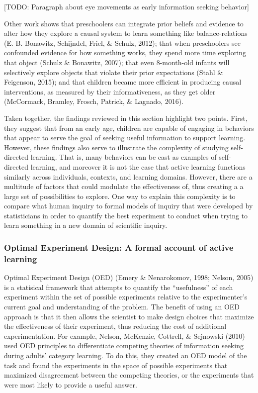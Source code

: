 \documentclass[a4paper,man,apacite,floatsintext]{apa6}
\begin{document}
{[}TODO: Paragraph about eye movements as early information seeking
behavior{]}

Other work shows that preschoolers can integrate prior beliefs and
evidence to alter how they explore a causal system to learn something
like balance-relations (E. B. Bonawitz, Schijndel, Friel, \& Schulz,
2012); that when preschoolers see confounded evidence for how something
works, they spend more time exploring that object (Schulz \& Bonawitz,
2007); that even 8-month-old infants will selectively explore objects
that violate their prior expectations (Stahl \& Feigenson, 2015); and
that children became more efficient in producing causal interventions,
as measured by their informativeness, as they get older (McCormack,
Bramley, Frosch, Patrick, \& Lagnado, 2016).

Taken together, the findings reviewed in this section highlight two
points. First, they suggest that from an early age, children are capable
of engaging in behaviors that appear to serve the goal of seeking useful
information to support learning. However, these findings also serve to
illustrate the complexity of studying self-directed learning. That is,
many behaviors can be cast as examples of self-directed learning, and
moreover it is not the case that active learning functions similarly
across individuals, contexts, and learning domains. However, there are a
multitude of factors that could modulate the effectiveness of, thus
creating a a large set of possibilities to explore. One way to explain
this complexity is to compare what human inquiry to formal models of
inquiry that were developed by statisticians in order to quantify the
best experiment to conduct when trying to learn something in a new
domain of scientific inquiry.

\subsubsection{Optimal Experiment Design: A formal account of active
learning}\label{optimal-experiment-design-a-formal-account-of-active-learning}

Optimal Experiment Design (OED) (Emery \& Nenarokomov, 1998; Nelson,
2005) is a statisical framework that attempts to quantify the
``usefulness'' of each experiment within the set of possible experiments
relative to the experimenter's current goal and understanding of the
problem. The benefit of using an OED approach is that it then allows the
scientist to make design choices that maximize the effectiveness of
their experiment, thus reducing the cost of additional experimentation.
For example, Nelson, McKenzie, Cottrell, \& Sejnowski (2010) used OED
principles to differentiate competing theories of information seeking
during adults' category learning. To do this, they created an OED model
of the task and found the experiments in the space of possible
experiments that maximized disagreement between the competing theories,
or the experiments that were most likely to provide a useful answer.
\end{document}
